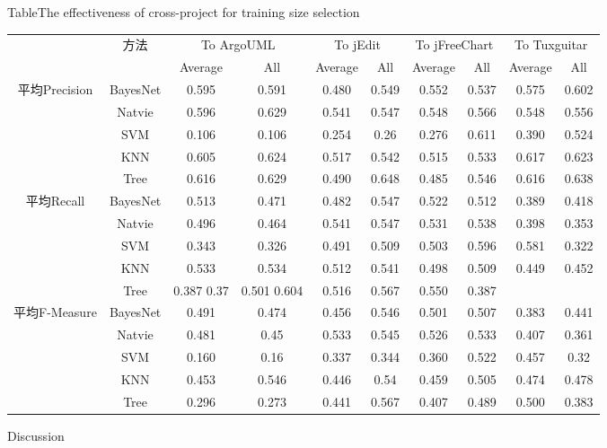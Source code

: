 \begin{sidewaystable} [htbp]
{Table$\!$}{The effectiveness of cross-project for training size selection}
\vspace{0.5em}
\centering
\wuhao
\begin{tabular}{cccccccccc}
\toprule[1.5pt]
~\multirow{2}{*}{度量}&\multirow{2}{*}{方法}&\multicolumn{2}{c}{To ArgoUML}&\multicolumn{2}{c}{To jEdit}&\multicolumn{2}{c}{To jFreeChart}&\multicolumn{2}{c}{To  Tuxguitar}\\
\cline{3-10}
~&~&{Average}&{All}&{Average}&{All}&{Average}&{All}&{Average}&{All}\\
\midrule[1pt]
\multirow{5}{*}{平均Precision}
&BayesNet&	0.595&	0.591&0.480&	0.549&	0.552&	0.537&	0.575&	0.602\\
&Natvie&	0.596&	0.629	&0.541&	0.547&	0.548&	0.566&	0.548&	0.556\\
&SVM&	0.106&	0.106&	0.254&	0.26&	0.276	&0.611&	0.390&	0.524\\
&KNN&	0.605&	0.624&	0.517&	0.542&	0.515&	0.533&	0.617&	0.623\\
&Tree	&0.616&	0.629&	0.490&	0.648&	0.485	&0.546	&0.616	&0.638\\
\hline
\multirow{5}{*}{平均Recall}								
&BayesNet&	0.513&	0.471&	0.482&	0.547&	0.522	&0.512&	0.389	&0.418\\
&Natvie&	0.496&	0.464&	0.541	&0.547&0.531	&0.538&0.398	&0.353\\
&SVM&	0.343&	0.326&	0.491&	0.509&	0.503&	0.596&	0.581&	0.322\\
&KNN&	0.533&	0.534&	0.512	&0.541&	0.498&	0.509&	0.449&	0.452\\
&Tree	&0.387	0.37&	0.501	0.604&	0.516&	0.567&	0.550&	0.387\\
\hline
\multirow{5}{*}{平均F-Measure}								
&BayesNet&	0.491	&0.474&	0.456&	0.546	&0.501&	0.507&	0.383	&0.441\\
&Natvie&	0.481&	0.45&	0.533&	0.545&	0.526&	0.533&	0.407&	0.361\\
&SVM&	0.160	&0.16	&0.337	&0.344	&0.360	&0.522	&0.457	&0.32\\
&KNN&	0.453&	0.546	&0.446&	0.54&	0.459	&0.505	&0.474&	0.478\\
&Tree&	0.296	&0.273	&0.441&	0.567	&0.407&	0.489	&0.500&	0.383\\
\bottomrule[1.5pt]
\end{tabular}
\end{sidewaystable}

{Discussion}

